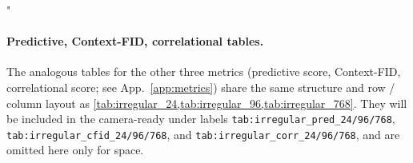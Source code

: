 "\documentclass{article}
\theoremstyle{plain}
\theoremstyle{definition}
\theoremstyle{remark}
\begin{document}
\begin{table}[h]
\centering
\caption{Full per-missing-rate discriminative scores at sequence length $768$. Same row / column conventions as \cref{tab:irregular_24}. MuJoCo is omitted at this length following the ImagenI2R protocol.}
\label{tab:irregular_768}
\end{table}

\paragraph{Predictive, Context-FID, correlational tables.}
The analogous tables for the other three metrics (predictive score, Context-FID, correlational score; see App.~\ref{app:metrics}) share the same structure and row / column layout as \cref{tab:irregular_24,tab:irregular_96,tab:irregular_768}. They will be included in the camera-ready under labels \texttt{tab:irregular\_pred\_24/96/768}, \texttt{tab:irregular\_cfid\_24/96/768}, and \texttt{tab:irregular\_corr\_24/96/768}, and are omitted here only for space.
\end{document}
